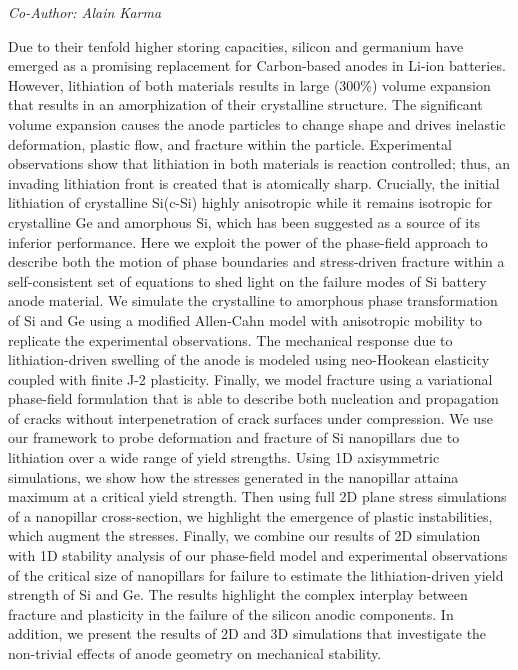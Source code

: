 \begin{center}
\textit{Co-Author: Alain Karma}
\end{center} 
Due to their tenfold higher storing capacities, silicon and germanium have emerged as a promising replacement for Carbon-based anodes in Li-ion batteries. However, lithiation of both materials results in large (300\%) volume expansion that results in an amorphization of their crystalline structure. The significant volume expansion causes the anode particles to change shape and drives inelastic deformation, plastic flow, and fracture within the particle. Experimental observations show that lithiation in both materials is reaction controlled; thus, an invading lithiation front is created that is atomically sharp. Crucially, the initial lithiation of crystalline Si(c-Si) highly anisotropic while it remains isotropic for crystalline Ge and amorphous Si, which has been suggested as a source of its inferior performance. Here we exploit the power of the phase-field approach to describe both the motion of phase boundaries and stress-driven fracture within a self-consistent set of equations to shed light on the failure modes of Si battery anode material. We simulate the crystalline to amorphous phase transformation of Si and Ge using a modified Allen-Cahn model with anisotropic mobility to replicate the experimental observations. The mechanical response due to lithiation-driven swelling of the anode is modeled using neo-Hookean elasticity coupled with finite J-2 plasticity. Finally, we model fracture using a variational phase-field formulation that is able to describe both nucleation and propagation of cracks without interpenetration of crack surfaces under compression. We use our framework to probe deformation and fracture of Si nanopillars due to lithiation over a wide range of yield strengths. Using 1D axisymmetric simulations, we show how the stresses generated in the nanopillar attaina maximum at a critical yield strength. Then using full 2D plane stress simulations of a nanopillar cross-section, we highlight the emergence of plastic instabilities, which augment the stresses.  Finally, we combine our results of 2D simulation with 1D stability analysis of our phase-field model and experimental observations of the critical size of nanopillars for failure to estimate the lithiation-driven yield strength of Si and Ge. The results highlight the complex interplay between fracture and plasticity in the failure of the silicon anodic components. In addition, we present the results of 2D and 3D simulations that investigate the non-trivial effects of anode geometry on mechanical stability.

